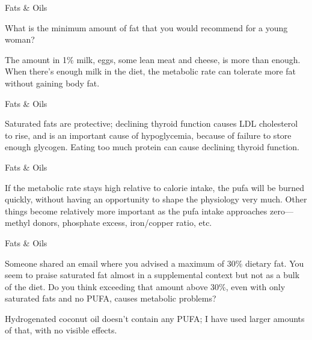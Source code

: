 \documentclass[11pt,oneside,openany,extrafontsizes]{memoir}
\begin{document}
\begin{qaexchange}{Fats \& Oils}

    \begin{question}
        What is the minimum amount of fat that you would recommend for a young woman? 
    \end{question}

    \begin{answer}
      The amount in 1\% milk, eggs, some lean meat and cheese, is more than enough. When there's enough milk in the diet, the metabolic rate can tolerate more fat without gaining body fat.
    \end{answer}
\end{qaexchange}

\begin{standalonequote}{Fats \& Oils}

    \begin{answer}
      Saturated fats are protective; declining thyroid function causes LDL cholesterol to rise, and is an important cause of hypoglycemia, because of failure to store enough glycogen. Eating too much protein can cause declining thyroid function.
    \end{answer}
\end{standalonequote}

\begin{standalonequote}{Fats \& Oils}

    \begin{answer}
      If the metabolic rate stays high relative to calorie intake, the pufa will be burned quickly, without having an opportunity to shape the physiology very much. Other things become relatively more important as the pufa intake approaches zero---methyl donors, phosphate excess, iron/copper ratio, etc.
    \end{answer}
\end{standalonequote}

\begin{qaexchange}{Fats \& Oils}

    \begin{question}
        Someone shared an email where you advised a maximum of 30\% dietary fat. You seem to praise saturated fat almost in a supplemental context but not as a bulk of the diet. Do you think exceeding that amount above 30\%, even with only saturated fats and no PUFA, causes metabolic problems?
    \end{question}

    \begin{answer}
      Hydrogenated coconut oil doesn't contain any PUFA; I have used larger amounts of that, with no visible effects.
    \end{answer}
\end{qaexchange}
\end{document}
